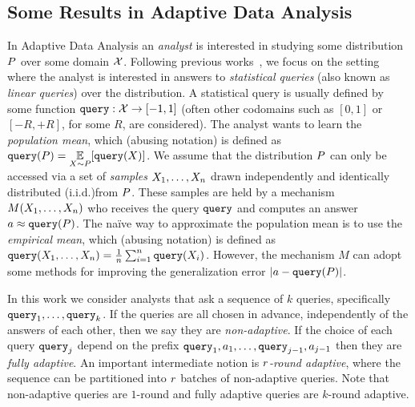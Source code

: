 \subsection{Some Results in Adaptive Data Analysis}
In Adaptive Data Analysis an \emph{analyst} is interested in studying some distribution $P$ over some domain $\mathcal{X}$.  Following previous works~\cite{DworkFHPRR15,HardtU14,BassilyNSSSU16}, we focus on the setting where the analyst is interested in answers to \emph{statistical queries} (also known as \emph{linear queries}) over the distribution.  A statistical query is usually defined by some function ${\tt query} : \mathcal{X} \to [-1,1]$ (often other codomains such as $[0,1]$ or $[-R,+R]$, for some $R$, are considered).  The analyst wants to learn the \emph{population mean}, which (abusing notation) is defined as 
$\query(\dist) = \ex{\sample \sim \dist}{\query(\sample)}$. 
%
We assume that the distribution $P$ can only be accessed via a set of \emph{samples} $X_1,\dots,X_n$ drawn independently and identically distributed (i.i.d.)from $P$.  These samples are held by a mechanism $M(X_1,\dots,X_n)$ who receives the query ${\tt query}$ and computes an answer 
$a \approx {\tt query}(P)$.
%
The na\"ive way to approximate the population mean is to use the \emph{empirical mean}, which (abusing notation) is defined as 
${\tt query}(X_1,\dots,X_n) = \frac{1}{n} \sum_{i=1}^{n} {\tt query}(X_i)$.
However, the mechanism $M$ can adopt some methods for improving the generalization error $| a- {\tt query}(P)|$.

In this work we consider analysts that ask a sequence of $k$ queries, specifically ${\tt query}_1,\dots,{\tt query}_k$.  If the queries are all chosen in advance, independently of the answers of each other, then we say they are \emph{non-adaptive}.  If the choice of each query ${\tt query}_j$ depend on the prefix ${\tt query}_1,a_1,\dots,{\tt query}_{j-1},a_{j-1}$ then they are \emph{fully adaptive}.  An important intermediate notion is \emph{$r$-round adaptive}, where the sequence can be partitioned into $r$ batches of non-adaptive queries.  Note that non-adaptive queries are $1$-round and fully adaptive queries are $k$-round adaptive.

